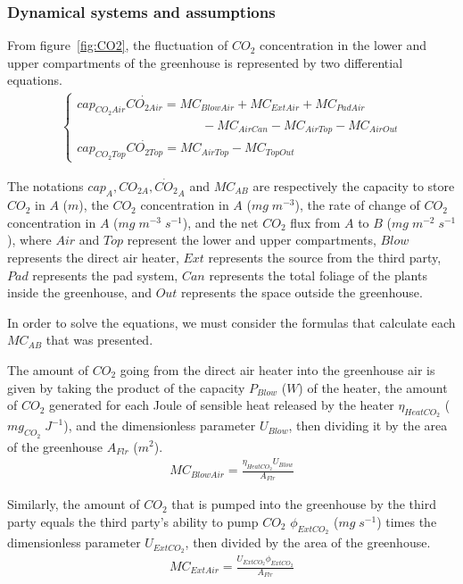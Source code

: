 \documentclass[a4paper]{article}
\begin{document}
\subsubsection{Dynamical systems and assumptions}
From figure~\ref{fig:CO2}, the fluctuation of \(CO_2\) concentration in the lower and upper compartments of the greenhouse is represented by two differential equations.
\begin{align}
  \begin{cases}
    cap_{CO_2Air}\dot{CO_{2Air}} = MC_{BlowAir} + MC_{ExtAir} + MC_{PadAir} \\ \qquad \qquad \qquad \qquad \qquad
    - MC_{AirCan} - MC_{AirTop} - MC_{AirOut}                               \\
    cap_{CO_2Top}\dot{CO_{2Top}} = MC_{AirTop} - MC_{TopOut}
  \end{cases}
\end{align}

The notations \(cap_A, CO_{2 A}, \dot{CO_2}_A\) and \(MC_{AB}\) are respectively the capacity to store \(CO_2\) in \(A\) (\(m\)), the \(CO_2\) concentration in \(A\) (\(mg\;m^{-3}\)), the rate of change of \(CO_2\) concentration in \(A\) (\(mg\;m^{-3}\;s^{-1}\)), and the net \(CO_2\) flux from \(A\) to \(B\) (\(mg\;m^{-2}\;s^{-1}\)), where \(Air\) and \(Top\) represent the lower and upper compartments, \(Blow\) represents the direct air heater, \(Ext\) represents the source from the third party, \(Pad\) represents the pad system, \(Can\) represents the total foliage of the plants inside the greenhouse, and \(Out\) represents the space outside the greenhouse.

In order to solve the equations, we must consider the formulas that calculate each \(MC_{AB}\) that was presented.

The amount of \(CO_2\) going from the direct air heater into the greenhouse air is given by taking the product of the capacity \(P_{Blow}\) (\(W\)) of the heater, the amount of \(CO_2\) generated for each Joule of sensible heat released by the heater \(\eta_{HeatCO_2}\) (\(mg_{CO_2}\;J^{-1}\)), and the dimensionless parameter \(U_{Blow}\), then dividing it by the area of the greenhouse \(A_{Flr}\) (\(m^2\)).
\begin{align}
  MC_{BlowAir} = \frac{\eta_{HeatCO_2}U_{Blow}}{A_{Flr}}
\end{align}

Similarly, the amount of \(CO_2\) that is pumped into the greenhouse by the third party equals the third party's ability to pump \(CO_2\) \(\phi_{ExtCO_2}\) (\(mg\;s^{-1}\)) times the dimensionless parameter \(U_{ExtCO_2}\), then divided by the area of the greenhouse.
\begin{align}
  MC_{ExtAir} = \frac{U_{ExtCO_2}\phi_{ExtCO_2}}{A_{Flr}}
\end{align}
\end{document}
